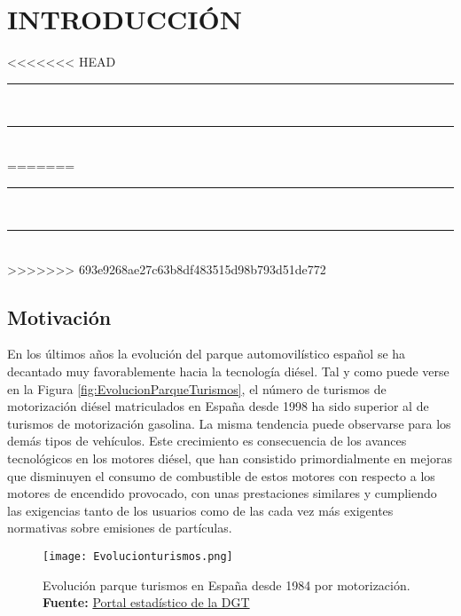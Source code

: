 \pagestyle{plain}
\chapter{INTRODUCCIÓN}\label{cap:Introduccion}
<<<<<<< HEAD
\noindent\rule{\linewidth}{1.3pt}\\
\startcontents[chapters]
\vspace{0.2cm}
\noindent\rule{\linewidth}{1.1pt}\\
=======
\vspace{0.2cm}
\noindent\rule{\linewidth}{1.5pt}\\
\startcontents[chapters]
\vspace{0.2cm}
\noindent\rule{\linewidth}{1.3pt}\\
>>>>>>> 693e9268ae27c63b8df483515d98b793d51de772
\newpage

\section{Motivación}\label{sec:Motivacion}

\par En los últimos años la evolución del parque automovilístico español se ha decantado muy favorablemente hacia la tecnología diésel. Tal y como puede verse en la Figura \ref{fig:EvolucionParqueTurismos}, el número de turismos de motorización diésel matriculados en España desde 1998 ha sido superior al de turismos de motorización gasolina. La misma tendencia puede observarse para los demás tipos de vehículos. Este crecimiento es consecuencia de los avances tecnológicos en los motores diésel, que han consistido primordialmente en mejoras que disminuyen el consumo de combustible de estos motores con respecto a los motores de encendido provocado, con unas prestaciones similares y cumpliendo las exigencias tanto de los usuarios como de las cada vez más exigentes normativas sobre emisiones de partículas.

\begin{figure}[h]
\centering
	\texttt{[image: Evolucionturismos.png]}	 
	\caption[Evolución histórica de turismos diésel y gasolina en España]{Evolución parque turismos en España desde 1984 por motorización.\\ \textbf{Fuente:} \href{https://sedeapl.dgt.gob.es/IEST2/menu.do?path=/vehiculos/parque/&file=inebase&type=pcaxis&L=0&js=1}{Portal estadístico de la DGT}}	
\end{figure} \label{fig:EvolucionParqueTurismos}

